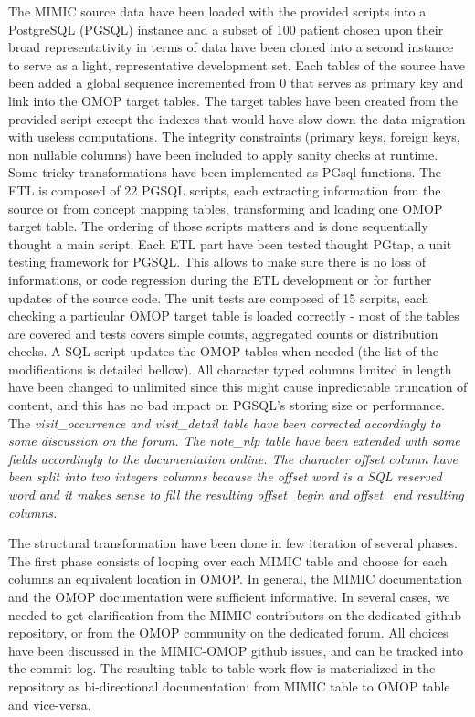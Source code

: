 
The MIMIC source data have been loaded with the provided scripts into a
PostgreSQL (PGSQL) instance and a subset of 100 patient chosen upon their
broad representativity in terms of data have been cloned into a second instance
to serve as a light, representative development set.  Each tables of the source
have been added a global sequence incremented from 0 that serves as primary key
and link into the OMOP target tables. The target tables have been created from
the provided script except the indexes that would have slow down the data
migration with useless computations. The integrity constraints (primary keys,
foreign keys, non nullable columns) have been included to apply sanity checks
at runtime. Some tricky transformations have been implemented as PGsql
functions.
The ETL is composed of 22 PGSQL scripts, each extracting information from the
source or from concept mapping tables, transforming and loading one OMOP target
table. The ordering of those scripts matters and is done sequentially thought a
main script.
Each ETL part have been tested thought PGtap, a unit testing framework for PGSQL.
This allows to make sure there is no loss of informations, or code regression
during the ETL development or for further updates of the source code.
The unit tests are composed of 15 scrpits, each checking a particular OMOP
target table is loaded correctly - most of the tables are covered and tests
covers simple counts, aggregated counts or distribution checks.
A SQL script updates the OMOP tables when needed (the list of the modifications
is detailed bellow). 
All character typed columns limited in length have been changed to unlimited
since this might cause inpredictable truncation of content, and this has no bad
impact on PGSQL's storing size or performance.
The \it{visit\_occurrence} and \it{visit\_detail} table have been corrected
accordingly to some discussion on the forum.
The \it{note\_nlp} table have been extended with some fields accordingly to
the documentation online. The character \it{offset} column have been split into
two integers columns because the offset word is a SQL reserved word and it
makes sense to fill the resulting \it{offset\_begin} and \it{offset\_end}
resulting columns.

The structural transformation have been done in few iteration of several phases.
The first phase consists of looping over each MIMIC table and choose for each
columns an equivalent location in OMOP. In general, the MIMIC documentation and
the OMOP documentation were sufficient informative. In several cases, we needed
to get clarification from the MIMIC contributors on the dedicated github
repository, or from the OMOP community on the dedicated forum.
All choices have been discussed in the MIMIC-OMOP github issues, and can be
tracked into the commit log. The resulting table to table work flow is
materialized in the repository as bi-directional documentation: from MIMIC
table to OMOP table and vice-versa.


